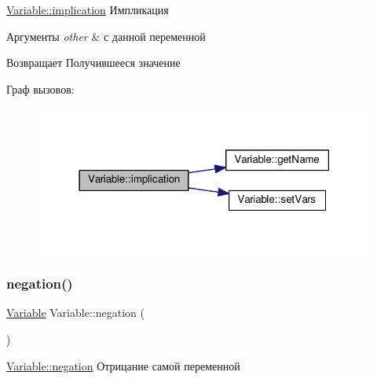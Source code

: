 \hyperlink{class_variable_a82a20d70ad58a132b487a7bc822b47d1}{Variable\+::implication} Импликация 


\begin{DoxyParams}{Аргументы}
{\em other} & с данной переменной \\
\hline
\end{DoxyParams}
\begin{DoxyReturn}{Возвращает}
Получившееся значение 
\end{DoxyReturn}
Граф вызовов\+:\nopagebreak
\begin{figure}[H]
\begin{center}
\leavevmode
\includegraphics[width=318pt]{class_variable_a82a20d70ad58a132b487a7bc822b47d1_cgraph}
\end{center}
\end{figure}
\mbox{\label{class_variable_a7f2a3b1b8540781703f5435253171978}} 
\subsubsection{\texorpdfstring{negation()}{negation()}}
{\footnotesize\ttfamily \hyperlink{class_variable}{Variable} Variable\+::negation (\begin{DoxyParamCaption}{ }\end{DoxyParamCaption})}



\hyperlink{class_variable_a7f2a3b1b8540781703f5435253171978}{Variable\+::negation} Отрицание самой переменной 

